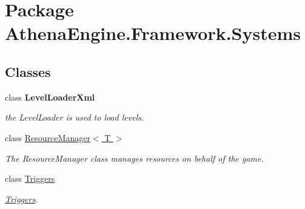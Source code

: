 \hypertarget{namespace_athena_engine_1_1_framework_1_1_systems}{\section{Package Athena\-Engine.\-Framework.\-Systems}
\label{namespace_athena_engine_1_1_framework_1_1_systems}
}
\subsection*{Classes}
\begin{DoxyCompactItemize}
\item 
class {\bfseries Level\-Loader\-Xml}
\begin{DoxyCompactList}\small\item\em the Level\-Loader is used to load levels. \end{DoxyCompactList}\item 
class \hyperlink{class_athena_engine_1_1_framework_1_1_systems_1_1_resource_manager_3_01_t_01_4}{Resource\-Manager$<$ T $>$}
\begin{DoxyCompactList}\small\item\em The Resource\-Manager class manages resources on behalf of the game. \end{DoxyCompactList}\item 
class \hyperlink{class_athena_engine_1_1_framework_1_1_systems_1_1_triggers}{Triggers}
\begin{DoxyCompactList}\small\item\em \hyperlink{class_athena_engine_1_1_framework_1_1_systems_1_1_triggers}{Triggers}. \end{DoxyCompactList}\end{DoxyCompactItemize}
